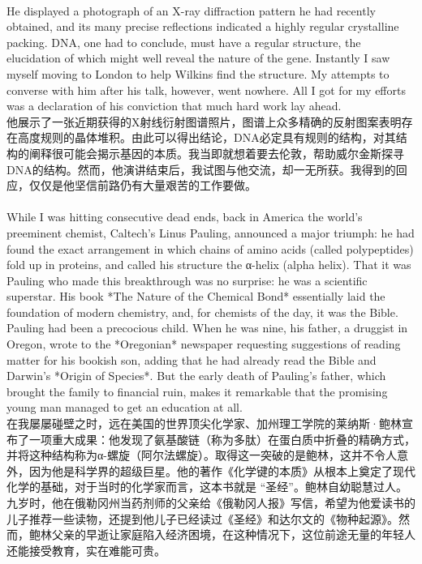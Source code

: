 \documentclass{article}
\begin{document}
\\
He displayed a photograph of an X-ray diffraction pattern he had recently obtained, and its many precise reflections indicated a highly regular crystalline packing. DNA, one had to conclude, must have a regular structure, the elucidation of which might well reveal the nature of the gene. Instantly I saw myself moving to London to help Wilkins find the structure. My attempts to converse with him after his talk, however, went nowhere. All I got for my efforts was a declaration of his conviction that much hard work lay ahead.\\
他展示了一张近期获得的X射线衍射图谱照片，图谱上众多精确的反射图案表明存在高度规则的晶体堆积。由此可以得出结论，DNA必定具有规则的结构，对其结构的阐释很可能会揭示基因的本质。我当即就想着要去伦敦，帮助威尔金斯探寻DNA的结构。然而，他演讲结束后，我试图与他交流，却一无所获。我得到的回应，仅仅是他坚信前路仍有大量艰苦的工作要做。\\

\\
While I was hitting consecutive dead ends, back in America the world’s preeminent chemist, Caltech’s Linus Pauling, announced a major triumph: he had found the exact arrangement in which chains of amino acids (called polypeptides) fold up in proteins, and called his structure the α-helix (alpha helix). That it was Pauling who made this breakthrough was no surprise: he was a scientific superstar. His book *The Nature of the Chemical Bond* essentially laid the foundation of modern chemistry, and, for chemists of the day, it was the Bible. Pauling had been a precocious child. When he was nine, his father, a druggist in Oregon, wrote to the *Oregonian* newspaper requesting suggestions of reading matter for his bookish son, adding that he had already read the Bible and Darwin’s *Origin of Species*. But the early death of Pauling’s father, which brought the family to financial ruin, makes it remarkable that the promising young man managed to get an education at all.\\
在我屡屡碰壁之时，远在美国的世界顶尖化学家、加州理工学院的莱纳斯·鲍林宣布了一项重大成果：他发现了氨基酸链（称为多肽）在蛋白质中折叠的精确方式，并将这种结构称为α-螺旋（阿尔法螺旋）。取得这一突破的是鲍林，这并不令人意外，因为他是科学界的超级巨星。他的著作《化学键的本质》从根本上奠定了现代化学的基础，对于当时的化学家而言，这本书就是 “圣经”。鲍林自幼聪慧过人。九岁时，他在俄勒冈州当药剂师的父亲给《俄勒冈人报》写信，希望为他爱读书的儿子推荐一些读物，还提到他儿子已经读过《圣经》和达尔文的《物种起源》。然而，鲍林父亲的早逝让家庭陷入经济困境，在这种情况下，这位前途无量的年轻人还能接受教育，实在难能可贵。\\
\end{document}
